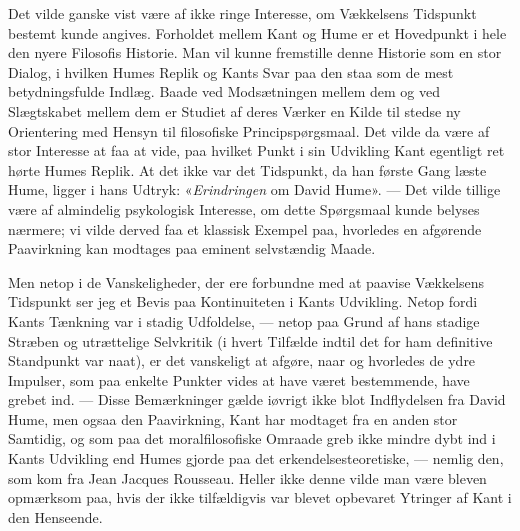 \documentclass[12pt,a4paper]{article}
\newcommand{\apage}[1]{\marginnote{\footnotesize\textit{[#1]}}}
\begin{document}
Det vilde ganske vist være af ikke ringe Interesse, om Vækkelsens
Tidspunkt bestemt kunde angives. Forholdet mellem Kant og Hume er et
Hovedpunkt i hele den nyere Filosofis Historie. Man vil kunne fremstille
denne Historie som en stor Dialog, i hvilken Humes Replik og Kants Svar
paa den staa som de mest betydningsfulde Indlæg. Baade ved Modsætningen
mellem dem og ved Slægtskabet mellem dem er Studiet af deres Værker en
Kilde til stedse ny Orientering med Hensyn til filosofiske
Principspørgsmaal. Det vilde da være af stor Interesse at faa at vide,
paa hvilket Punkt i sin Udvikling Kant egentligt ret hørte Humes Replik.
At det ikke var det Tidspunkt, da han første Gang læste Hume, ligger i
hans Udtryk: «\emph{Erindringen} om David Hume». --- Det vilde tillige være af
almindelig psykologisk Interesse, om dette Spørgsmaal kunde belyses
nærmere; vi vilde derved faa et klassisk Exempel paa, hvorledes en
afgørende Paavirkning kan modtages paa eminent selvstændig Maade.

Men netop i de Vanskeligheder, der ere forbundne med at paavise
Vækkelsens \apage{8}  Tidspunkt ser jeg et Bevis paa Kontinuiteten i Kants
Udvikling. Netop fordi Kants Tænkning var i stadig Udfoldelse, --- netop
paa Grund af hans stadige Stræben og utrættelige Selvkritik (i hvert
Tilfælde indtil det for ham definitive Standpunkt var naat), er det
vanskeligt at afgøre, naar og hvorledes de ydre Impulser, som paa enkelte
Punkter vides at have været bestemmende, have grebet ind. --- Disse
Bemærkninger gælde iøvrigt ikke blot Indflydelsen fra David Hume, men
ogsaa den Paavirkning, Kant har modtaget fra en anden stor Samtidig, og
som paa det moralfilosofiske Omraade greb ikke mindre dybt ind i Kants
Udvikling end Humes gjorde paa det erkendelsesteoretiske, --- nemlig den,
som kom fra Jean Jacques Rousseau. Heller ikke denne vilde man være
bleven opmærksom paa, hvis der ikke tilfældigvis var blevet opbevaret
Ytringer af Kant i den Henseende.
\end{document}
